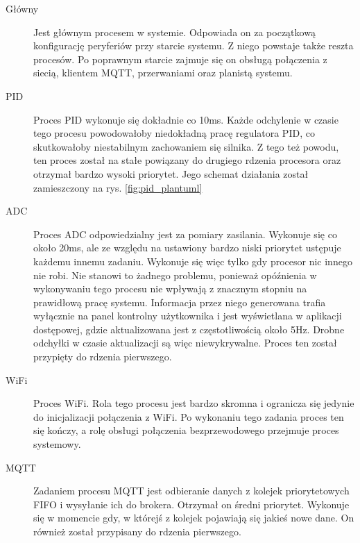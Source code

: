             \begin{description}
                \item [Główny] Jest głównym procesem w systemie. Odpowiada on za początkową konfigurację peryferiów przy starcie systemu. Z niego powstaje także reszta procesów. Po poprawnym starcie zajmuje się on obsługą połączenia z siecią, klientem MQTT, przerwaniami oraz planistą systemu. 
                
                \item [PID] Proces PID wykonuje się dokładnie co 10ms. Każde odchylenie w czasie tego procesu powodowałoby niedokładną pracę regulatora PID, co skutkowałoby niestabilnym zachowaniem się silnika. Z tego też powodu, ten proces został na stałe powiązany do drugiego rdzenia procesora oraz otrzymał bardzo wysoki priorytet. Jego schemat działania został zamieszczony na rys. \ref{fig:pid_plantuml} 
                
                \item [ADC] Proces ADC odpowiedzialny jest za pomiary zasilania. Wykonuje się co około 20ms, ale ze względu na ustawiony bardzo niski priorytet ustępuje każdemu innemu zadaniu. Wykonuje się więc tylko gdy procesor nic innego nie robi. Nie stanowi to żadnego problemu, ponieważ opóźnienia w wykonywaniu tego procesu nie wpływają z znacznym stopniu na prawidłową pracę systemu. Informacja przez niego generowana trafia wyłącznie na panel kontrolny użytkownika i jest wyświetlana w aplikacji dostępowej, gdzie aktualizowana jest z częstotliwością około 5Hz. Drobne odchyłki w czasie aktualizacji są więc niewykrywalne. Proces ten został przypięty do rdzenia pierwszego.
                
                \item [WiFi] Proces WiFi. Rola tego procesu jest bardzo skromna i ogranicza się jedynie do inicjalizacji połączenia z WiFi. Po wykonaniu tego zadania proces ten się kończy, a rolę obsługi połączenia bezprzewodowego przejmuje proces systemowy.
                
                \item [MQTT] Zadaniem procesu MQTT jest odbieranie danych z kolejek priorytetowych FIFO i wysyłanie ich do brokera. Otrzymał on średni priorytet. Wykonuje się w momencie gdy, w którejś z kolejek pojawiają się jakieś nowe dane. On również został przypisany do rdzenia pierwszego.
                
            \end{description}
            
